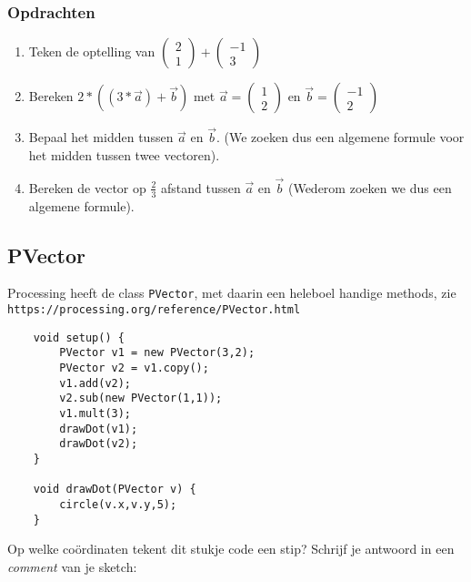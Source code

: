 \subsubsection{Opdrachten}
\begin{enumerate}
	\item Teken de optelling van $\begin{pmatrix}2\\1\end{pmatrix}+\begin{pmatrix}-1\\3\end{pmatrix}$
	\item Bereken $2*((3*\vec{a})+\vec{b})$ met $\vec{a}=\begin{pmatrix}1\\2\end{pmatrix}$ en $\vec{b} = \begin{pmatrix}-1\\2\end{pmatrix}$
	\item Bepaal het midden tussen $\vec{a}$ en $\vec{b}$. (We zoeken dus een algemene formule voor het midden tussen twee vectoren).
	\item Bereken de vector op $\frac{2}{3}$ afstand tussen $\vec{a}$ en $\vec{b}$ (Wederom zoeken we dus een algemene formule).
\end{enumerate}

\subsection{PVector}
Processing heeft de class \texttt{PVector}, met daarin een heleboel handige methods, zie \texttt{https://processing.org/reference/PVector.html}
\begin{lstlisting}
	void setup() {
		PVector v1 = new PVector(3,2);
		PVector v2 = v1.copy();
		v1.add(v2);
		v2.sub(new PVector(1,1));
		v1.mult(3);
		drawDot(v1);
		drawDot(v2);
	}
	
	void drawDot(PVector v) {
		circle(v.x,v.y,5);
	}
\end{lstlisting}
Op welke co\"ordinaten tekent dit stukje code een stip?
Schrijf je antwoord in een \textit{comment} van je sketch:

